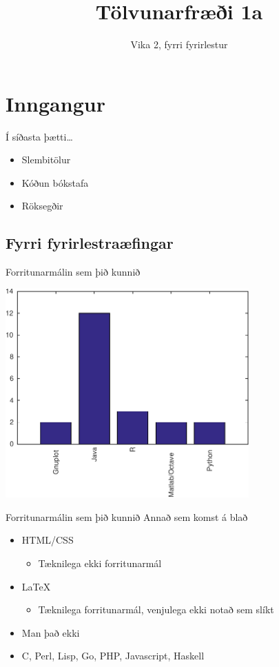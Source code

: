 \documentclass[handout]{beamer}
\title{Tölvunarfræði 1a}
\subtitle{Vika 2, fyrri fyrirlestur}
\begin{document}
\begin{frame}
\titlepage
\end{frame}

\section{Inngangur}

\begin{frame}{Í síðasta þætti\ldots}
\begin{itemize}
 \item Slembitölur
 \item Kóðun bókstafa
 \item Röksegðir
\end{itemize}
\end{frame}

\subsection{Fyrri fyrirlestraæfingar}

\begin{frame}{Forritunarmálin sem þið kunnið}
\begin{center}
\includegraphics[width=0.7\textwidth]{Pics/forritunarmaladreifing}
\end{center}
\end{frame}

\begin{frame}{Forritunarmálin sem þið kunnið}
Annað sem komst á blað\pause
\begin{itemize}
 \item HTML/CSS
 \begin{itemize}
  \item Tæknilega ekki forritunarmál \pause
 \end{itemize}
 \item \LaTeX
 \begin{itemize}
  \item Tæknilega forritunarmál, venjulega ekki notað sem slíkt \pause
 \end{itemize}
 \item Man það ekki \pause
 \item C, Perl, Lisp, Go, PHP, Javascript, Haskell
\end{itemize}
\end{frame}
\end{document}
